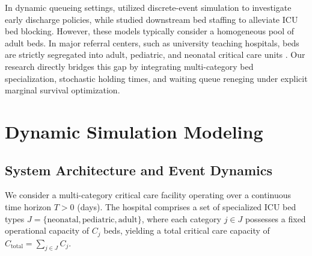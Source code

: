 \documentclass{ro}
\begin{document}
In dynamic queueing settings, \cite{Bilbao_2022} utilized discrete-event simulation to investigate early discharge policies, while \cite{Valeva_2023} studied downstream bed staffing to alleviate ICU bed blocking. However, these models typically consider a homogeneous pool of adult beds. In major referral centers, such as university teaching hospitals, beds are strictly segregated into adult, pediatric, and neonatal critical care units \cite{king2019modelling, bittencourt2006sistema, machado2016qualidade}. Our research directly bridges this gap by integrating multi-category bed specialization, stochastic holding times, and waiting queue reneging under explicit marginal survival optimization.

\section{Dynamic Simulation Modeling}
\label{sec:modeling}

\subsection{System Architecture and Event Dynamics}

We consider a multi-category critical care facility operating over a continuous time horizon $T > 0$ (days). The hospital comprises a set of specialized ICU bed types $J = \{\text{neonatal}, \text{pediatric}, \text{adult}\}$, where each category $j \in J$ possesses a fixed operational capacity of $C_j$ beds, yielding a total critical care capacity of $C_{\text{total}} = \sum_{j \in J} C_j$.
\end{document}
